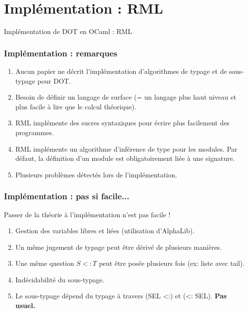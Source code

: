 \documentclass{beamer}
\begin{document}
\section{Implémentation : RML}

\begin{frame}
	\begin{center}
		\Huge{Implémentation de DOT en OCaml : RML}
	\end{center}
\end{frame}

\begin{frame}
  \frametitle{Implémentation : remarques}
	\begin{center}
    \begin{enumerate}
      \item Aucun papier ne décrit l'implémentation d'algorithmes de typage et
        de sous-typage pour DOT.
      \item Besoin de définir un langage de surface (= un langage plus haut
        niveau et plus facile à lire que le calcul théorique).
      \item RML implémente des sucres syntaxiques pour écrire plus
        facilement des programmes.
      \item RML implémente un algorithme d'inférence de type pour les modules.
        Par défaut, la définition d'un module est obligatoirement liée à une signature.
      \item Plusieurs problèmes détectés lors de l'implémentation.
      \end{enumerate}
	\end{center}
\end{frame}

\begin{frame}
  \frametitle{Implémentation : pas si facile...}
  Passer de la théorie à l'implémentation n'est pas facile !
  \begin{enumerate}
  \item Gestion des variables libres et liées (utilisation d'AlphaLib).
  \item Un même jugement de typage peut être dérivé de plusieurs manières.
  \item Une même question $S <: T$ peut être posée plusieurs fois (ex: liste
    avec tail).
  \item Indécidabilité du sous-typage.
  \item Le sous-typage dépend du typage à travers (SEL <:) et (<: SEL). \textbf{Pas usuel.}
  \end{enumerate}
\end{frame}
\end{document}
